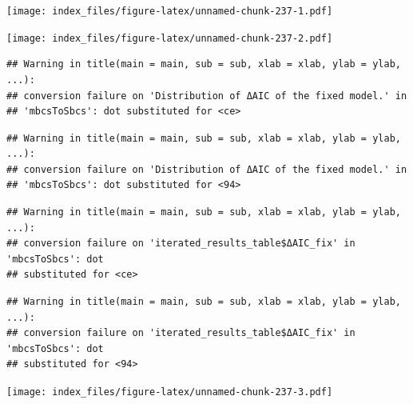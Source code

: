\documentclass[
]{article}
\newenvironment{Shaded}{\begin{snugshade}}{\end{snugshade}}
\newcommand{\AttributeTok}[1]{\textcolor[rgb]{0.77,0.63,0.00}{#1}}
\newcommand{\FunctionTok}[1]{\textcolor[rgb]{0.00,0.00,0.00}{#1}}
\newcommand{\NormalTok}[1]{#1}
\newcommand{\SpecialCharTok}[1]{\textcolor[rgb]{0.00,0.00,0.00}{#1}}
\newcommand{\StringTok}[1]{\textcolor[rgb]{0.31,0.60,0.02}{#1}}
\begin{document}
\texttt{[image: index\_files/figure-latex/unnamed-chunk-237-1.pdf]}

\begin{Shaded}
\end{Shaded}

\texttt{[image: index\_files/figure-latex/unnamed-chunk-237-2.pdf]}

\begin{Shaded}
\end{Shaded}

\begin{verbatim}
## Warning in title(main = main, sub = sub, xlab = xlab, ylab = ylab, ...):
## conversion failure on 'Distribution of ΔAIC of the fixed model.' in
## 'mbcsToSbcs': dot substituted for <ce>
\end{verbatim}

\begin{verbatim}
## Warning in title(main = main, sub = sub, xlab = xlab, ylab = ylab, ...):
## conversion failure on 'Distribution of ΔAIC of the fixed model.' in
## 'mbcsToSbcs': dot substituted for <94>
\end{verbatim}

\begin{verbatim}
## Warning in title(main = main, sub = sub, xlab = xlab, ylab = ylab, ...):
## conversion failure on 'iterated_results_table$ΔAIC_fix' in 'mbcsToSbcs': dot
## substituted for <ce>
\end{verbatim}

\begin{verbatim}
## Warning in title(main = main, sub = sub, xlab = xlab, ylab = ylab, ...):
## conversion failure on 'iterated_results_table$ΔAIC_fix' in 'mbcsToSbcs': dot
## substituted for <94>
\end{verbatim}

\texttt{[image: index\_files/figure-latex/unnamed-chunk-237-3.pdf]}

\begin{Shaded}
\end{Shaded}
\end{document}
